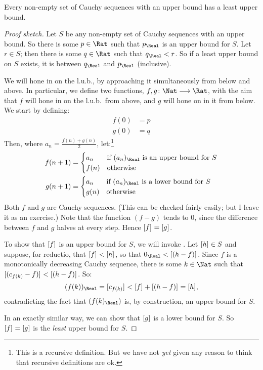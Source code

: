 \documentclass[../../../include/open-logic-section]{subfiles}
\begin{document}
\begin{thm}
Every non-empty set of Cauchy sequences with an upper bound has a
least upper bound.
\end{thm}

\begin{proof}[Proof sketch] Let $S$ be any non-empty set of Cauchy
sequences with an upper bound. So there is some $p \in \Rat$ such that
$p_{\Real}$ is an upper bound for $S$. Let $r \in S$; then there is
some $q \in \Rat$ such that $q_{\Real} < r$. So if a least upper bound
on $S$ exists, it is between $q_\Real$ and $p_\Real$ (inclusive). 

We will hone in on the l.u.b., by approaching it simultaneously from
below and above. In particular, we define two functions, $f, g \colon
\Nat \to \Rat$, with the aim that $f$ will hone in on the l.u.b.\ from
above, and $g$ will hone on in it from below. We start by defining:
\begin{align*}
	f(0) &= p \\
	g(0) &= q
\end{align*}
Then, where $a_n = \frac{f(n) + g(n)}{2}$, let:\footnote{This is a
recursive definition. But we have not \emph{yet} given any reason to
think that recursive definitions are ok.}
\begin{align*}
	f(n+1) &=
	\begin{cases}
		a_n &\text{if $(a_n)_\Real$ is an upper bound for }S\\
		f(n)&\text{otherwise}
	\end{cases}\\
	g(n+1) &=
	\begin{cases}
		a_n &\text{if $(a_n)_\Real$ is a lower bound for }S\\
	 	g(n) &\text{otherwise}
	\end{cases}
\end{align*}
Both $f$ and $g$ are Cauchy sequences. (This can be checked fairly
easily; but I leave it as an exercise.) Note that the function $(f-g)$
tends to $0$, since the difference between $f$ and $g$ halves at every
step. Hence $[f]_{} = [g]_{}$. 

To show that  $[f]_{}$ is an upper bound for $S$, we will
invoke . Let $[h]_{} \in S$ and
suppose, for reductio, that $[f]_{} < [h]_{}$, so that
$0_\Real < \equivrep{(h-f)}{}$. Since $f$ is a monotonically
decreasing Cauchy sequence, there is some $k \in \Nat$ such that
$[(c_{f(k)} - f)]_{} < [(h-f)]_{}$. So:
\[
(f(k))_\Real  = \equivrep{c_{f(k)}}{} < \equivrep{f}{} + \equivrep{(h-f)}{} = \equivrep{h}{},
\]
contradicting the fact that $(f(k)_\Real)$ is, by construction, an
upper bound for $S$.

In an exactly similar way, we can show that $[g]_{}$ is a
lower bound for $S$. So $[f]_{} = [g]_{}$ is the
\emph{least} upper bound for $S$.
\end{proof}
\end{document}
